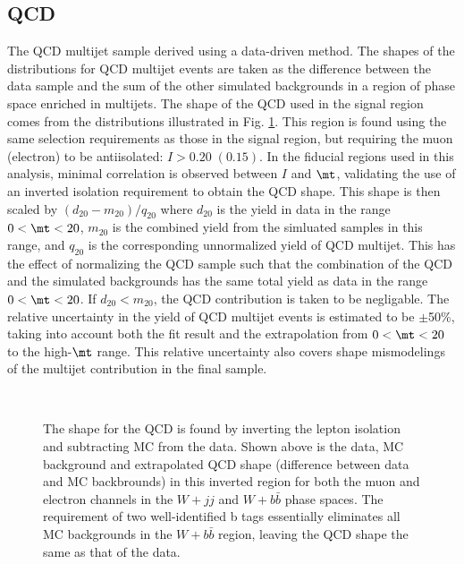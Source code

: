 \subsection{QCD}
\label{sec:qcd}
The QCD multijet sample derived using a data-driven method. 
The shapes of the distributions for QCD multijet events are taken as the difference between
 the data sample and the sum of the other simulated backgrounds in a region of phase
 space enriched in multijets.
The shape of the QCD used in the signal region comes from the distributions 
 illustrated in Fig. \ref{fig:qcdshape}.
This region is found using the same selection requirements as those in the signal region,
 but requiring the muon (electron) to be antiisolated: $I > 0.20 \; (0.15)$.
In the fiducial regions used in this analysis, minimal correlation
 is observed between $I$ and $\mt$, validating
 the use of an inverted isolation requirement to obtain
 the QCD shape.
This shape is then scaled by $ (d_{20}-m_{20})/q_{20} $ where
 $d_{20}$ is the yield in data in the range $0<\mt<20$, $m_{20}$ is the combined
 yield from the simluated samples in this range, and $q_{20}$ is the corresponding
 unnormalized yield of QCD multijet.
This has the effect of normalizing the QCD sample such that the combination of the QCD 
 and the simulated backgrounds has the same total yield as data in the range $0<\mt<20$.
If $d_{20}<m_{20}$, the QCD contribution is taken to be negligable. %
The relative uncertainty in the yield of QCD multijet events is
 estimated to be $\pm$50\%, taking into account both the fit result
 and the extrapolation from $0<\mt<20$ to the high-$\mt$ range.
This relative uncertainty also covers shape mismodelings
 of the multijet contribution in the final sample.


\begin{figure}
 \center
  \\
 \caption{The shape for the QCD is found by inverting the lepton
  isolation and subtracting MC from the data.
  Shown above is the data, MC background and 
   extrapolated QCD shape (difference between data
   and MC backbrounds) in this inverted
   region for both the muon and electron channels
   in the $W+jj$ and $W+b\bar{b}$ phase spaces.
  The requirement of two well-identified b tags
   essentially eliminates all MC backgrounds in
   the $W+b\bar{b}$ region, leaving the QCD shape 
   the same as that of the data.
  }
 \label{fig:qcdshape}
\end{figure}



